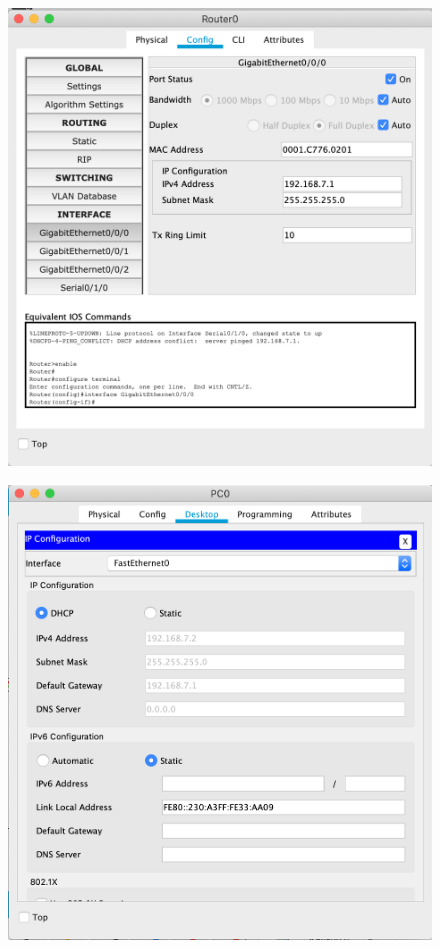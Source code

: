 \documentclass[a4paper,12pt]{article}
\begin{document}
	\begin{figure}[h!]
		\begin{center}
			{\includegraphics[scale = 0.45]{img/2.png}}
			\caption{}
			\label{ris:2}
		\end{center}
	\end{figure}

	\begin{figure}[h!]
		\begin{center}
			{\includegraphics[scale = 0.45]{img/3.png}}
			\caption{}
			\label{ris:3}
		\end{center}
	\end{figure}
\end{document}
